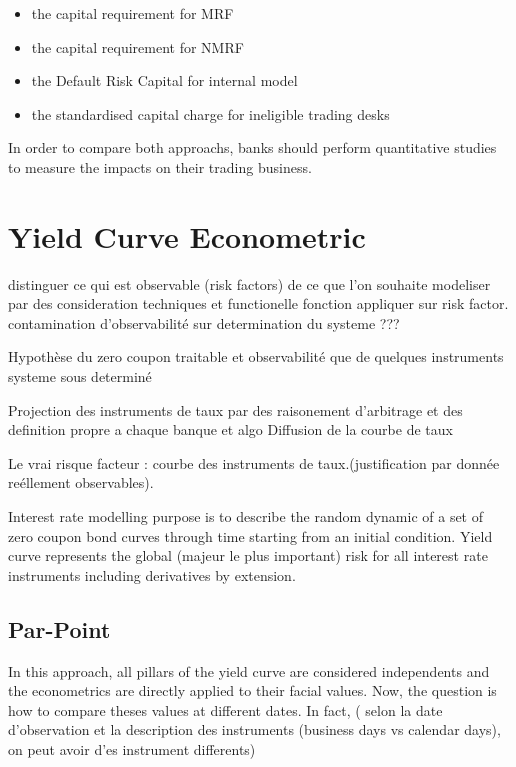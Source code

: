 \documentclass[10pt,a4paper]{report}
\begin{document}
\begin{itemize}
\item the capital requirement for MRF
\item the capital requirement for NMRF
\item the Default Risk Capital for internal model
\item the standardised capital charge for ineligible trading desks
\end{itemize}

\bigskip

In order to compare both approachs,  banks should perform quantitative studies to measure the impacts on their trading business.

\section{Yield Curve Econometric}

\bigskip distinguer ce qui est observable (risk factors) de ce que l'on
souhaite modeliser par des consideration techniques et functionelle fonction
appliquer sur risk factor. contamination d'observabilit\'{e} 
sur determination du systeme ???

Hypoth\`{e}se du zero coupon traitable et observabilit\'{e} que de quelques
instruments  systeme sous determin\'{e}

Projection des instruments de taux par des raisonement d'arbitrage et des
definition propre a chaque banque et algo Diffusion de la courbe de taux

 Le vrai risque facteur : courbe des instruments de
taux.(justification par donn\'{e}e re\'{e}llement observables).

Interest rate modelling purpose is to describe the random dynamic of a set
of zero coupon bond curves through time starting from an initial condition.
Yield curve represents the global (majeur le plus important) risk for all
interest rate instruments including derivatives by extension.

\subsection{Par-Point}

In this approach, all pillars of the yield curve are considered independents
and the econometrics are directly applied to their facial values. Now, the
question is how to compare theses values at different dates. In fact, (
selon la date d'observation et la description des instruments (business days
vs calendar days), on peut avoir d'es instrument differents)
\end{document}
